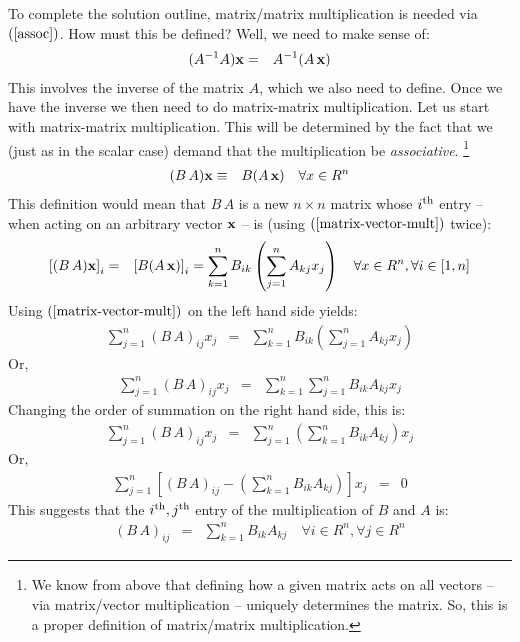 \documentclass{article}
\begin{document}
To complete the solution outline, matrix/matrix multiplication is needed
via $(\ref{assoc})$. How must this be defined?
Well, we need to make sense of:
\begin{eqnarray}
  (A^{-1} A) {\bf x} & = & A^{-1} (A \, {\bf x}) 
\end{eqnarray}
This involves the inverse of the matrix $A$, which we also need to define. Once
we have the inverse we then need to do matrix-matrix multiplication.
Let us start with matrix-matrix multiplication.
This will be determined by the fact that we (just as in the scalar case) demand that the multiplication
be {\em associative\/}.
\footnote{We know from above that defining how a given matrix acts on all vectors --
  via matrix/vector multiplication -- uniquely determines the matrix. So, this is a proper definition of matrix/matrix multiplication.}
\begin{eqnarray}
    (B \, A) {\bf x} & \equiv & B (A \, {\bf x}) \quad \forall x \in R^n
\end{eqnarray}
This definition would mean that $B \, A$ is a new $n \times n$ matrix whose
$i^{\rm th}$ entry -- when acting on an arbitrary vector ${\bf x}$ --
is (using $(\ref{matrix-vector-mult})$ twice):
\begin{eqnarray}
    \left[(B \, A) {\bf x}\right]_i &  = & \left[B (A \, {\bf x})\right]_i = \sum_{k=1}^n B_{ik} \left(\sum_{j=1}^n A_{kj} x_j\right) \quad \forall x \in R^n, \forall i \in [1,n]
\end{eqnarray}
Using $(\ref{matrix-vector-mult})$ on the left hand side yields:
\begin{eqnarray}
  \sum_{j=1}^n (B \, A)_{ij} x_j &  = & \sum_{k=1}^n B_{ik} \left(\sum_{j=1}^n A_{kj} x_j\right)
\end{eqnarray}
Or,
\begin{eqnarray}
  \sum_{j=1}^n (B \, A)_{ij} x_j &  = & \sum_{k=1}^n \sum_{j=1}^n B_{ik} A_{kj} x_j
\end{eqnarray}
Changing the order of summation on the right hand side, this is:
\begin{eqnarray}
  \sum_{j=1}^n (B \, A)_{ij} x_j &  = & \sum_{j=1}^n \left(\sum_{k=1}^n B_{ik} A_{kj}\right) x_j \label{matrix-matrix-deriv}
\end{eqnarray}
Or,
\begin{eqnarray}
    \sum_{j=1}^n \left[ (B \, A)_{ij} - \left(\sum_{k=1}^n B_{ik} A_{kj}\right)\right] x_j & = & 0\label{matrix-matrix-deriv-2}
\end{eqnarray}
This suggests that the $i^{\rm th}, j^{\rm th}$ entry of the multiplication of $B$ and $A$ is:
\begin{eqnarray}
    (B \, A)_{ij} & = & \sum_{k=1}^n B_{ik} A_{kj} \label{matrix-matrix-mult} \quad \forall i \in R^n, \forall j \in R^n
\end{eqnarray}
\end{document}
